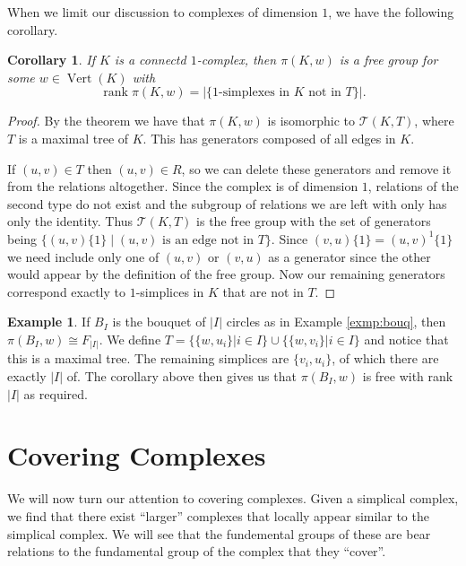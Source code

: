 \documentclass[12pt]{article}
\newtheorem{corollary}{Corollary}[theorem]
\theoremstyle{definition}
\newtheorem{example}{Example}[section]
\numberwithin{equation}{theorem}
\begin{document}
When we limit our discussion to complexes of dimension $1$, we have the following corollary.

\begin{corollary}
  If $K$ is a connectd $1$-complex, then $\pi(K,w)$ is a free group for some $w \in \operatorname{Vert}(K)$ with
  \begin{equation*}
    \operatorname{rank} \pi(K,w) = |\{1 \text{-simplexes in } K \text{ not in } T \}|.
  \end{equation*}
\end{corollary}

\begin{proof}
  By the theorem we have that $\pi(K,w)$ is isomorphic to $\mathcal{T}(K,T)$, where $T$ is a maximal tree of $K$. This has generators composed of all edges in $K$.

  If $(u,v) \in T$ then $(u,v) \in R$, so we can delete these generators and remove it from the relations altogether. Since the complex is of dimension $1$, relations of the second type do not exist and the subgroup of relations we are left with only has only the identity. Thus $\mathcal{T}(K,T)$ is the free group with the set of generators being $\{(u,v) \{1\} \mid (u,v) \text{ is an edge not in } T\}$. Since $(v,u) \{1\} = (u,v)^{1} \{ 1 \}$ we need include only one of $(u,v)$ or $(v,u)$ as a generator since the other would appear by the definition of the free group. Now our remaining generators correspond exactly to $1$-simplices in $K$ that are not in $T$.
\end{proof}


\begin{example}
  If $B_I$ is the bouquet of $|I|$ circles as in Example \ref{exmp:bouq}, then $\pi(B_I,w) \cong F_{|I|}$. We define $T = \{ \{w,u_i \} | i \in I \} \cup \{ \{w,v_i \} | i \in I \}$ and notice that this is a maximal tree. The remaining simplices are $\{v_i,u_i\}$, of which there are exactly $|I|$ of. The corollary above then gives us that $\pi(B_I,w)$ is free with rank $|I|$ as required.
\end{example}

\section{Covering Complexes}
We will now turn our attention to covering complexes. Given a simplical complex, we find that there exist ``larger'' complexes that locally appear similar to the simplical complex. We will see that the fundemental groups of these are bear relations to the fundamental group of the complex that they ``cover''.
\end{document}
